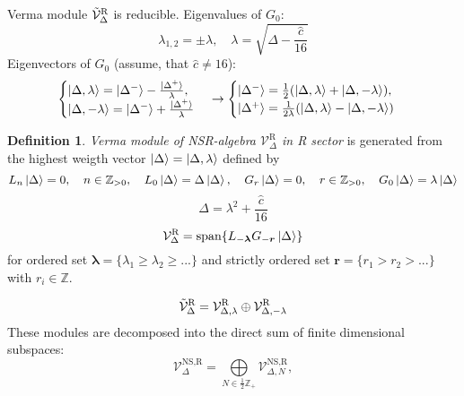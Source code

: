 \documentclass[12pt]{article}
\theoremstyle{definition}
\newtheorem{defin}{Definition}[]
\begin{document}
Verma module $\Tilde{\mathcal{V}}^{\text{R}}_\Delta$ is reducible. Eigenvalues of $G_0$:
\begin{equation}
    \lambda_{1,2}=\pm\lambda,\quad\lambda=\sqrt{\Delta-\frac{\hat{c}}{16}}
\end{equation}
Eigenvectors of $G_0$ (assume, that $\hat{c}\neq16$):
\begin{equation}
\begin{cases}
    \ket{\Delta,\lambda}=\ket{\Delta^-}-\frac{\ket{\Delta^+}}{\lambda},\\
    \ket{\Delta,-\lambda}=\ket{\Delta^-}+\frac{\ket{\Delta^+}}{\lambda}
\end{cases}\rightarrow\begin{cases}
    \ket{\Delta^-}=\frac{1}{2}(\ket{\Delta,\lambda}+\ket{\Delta,-\lambda}),\\
    \ket{\Delta^+}=\frac{1}{2\lambda}(\ket{\Delta,\lambda}-\ket{\Delta,-\lambda})
\end{cases}
\end{equation}
\begin{defin}
    \textit{Verma module of NSR-algebra $\mathcal{V}^{\text{R}}_\Delta$ in R sector} is generated from the highest weigth vector $\ket{\Delta}=\ket{\Delta,\lambda}$ defined by
    \begin{equation}
        L_n\ket{\Delta}=0,\quad n\in\mathbb{Z}_{>0},\quad L_0\ket{\Delta}=\Delta\ket{\Delta},\quad G_r\ket{\Delta}=0,\quad r\in\mathbb{Z}_{>0},\quad G_0\ket{\Delta}=\lambda\ket{\Delta}
    \end{equation}
    \begin{equation}
        \Delta=\lambda^2+\frac{\hat{c}}{16}
    \end{equation}
    \begin{equation}
        \mathcal{V}^{\text{R}}_\Delta=\text{span}\{L_{-\bm{\lambda}}G_{-\bm{r}}\ket{\Delta}\}
    \end{equation}
    for ordered set $\bm{\lambda} =\{\lambda_1\geq \lambda_2 \geq ...\}$ and strictly ordered set $\bm{r} = \{r_1 > r_2 > ...\}$ with $r_i\in\mathbb{Z}$.
\end{defin}
\begin{equation}
    \Tilde{\mathcal{V}}^{\text{R}}_\Delta=\mathcal{V}^{\text{R}}_{\Delta,\lambda}\oplus\mathcal{V}^{\text{R}}_{\Delta,-\lambda}
\end{equation}
These modules are decomposed into the direct sum of finite dimensional subspaces:
\begin{equation}
    \mathcal{V}^{\text{NS,R}}_{\Delta}=\bigoplus\limits_{N\in\frac{1}{2}\mathbb{Z}_+}\mathcal{V}^{\text{NS,R}}_{\Delta,N},
\end{equation}
\end{document}
